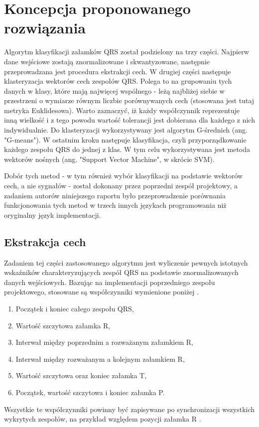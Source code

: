 \section{Koncepcja proponowanego rozwiązania}

\quad Algorytm klasyfikacji załamków QRS został podzielony na trzy części. Najpierw dane wejściowe zostają znormalizowane i skwantyzowane, następnie przeprowadzana jest procedura ekstrakcji cech. W drugiej części następuje klasteryzacja wektorów cech zespołów QRS. Polega to na grupowaniu tych danych w klasy, które mają najwięcej wspólnego - leżą najbliżej siebie w przestrzeni o wymiarze równym liczbie porównywanych cech (stosowana jest tutaj metryka Euklidesowa). Warto zaznaczyć, iż każdy współczynnik reprezentuje inną wielkość i z tego powodu wartość tolerancji jest dobierana dla każdego z nich indywidualnie. Do klasteryzacji wykorzystywany jest algorytm G-średnich (ang. "G-means"). W ostatnim kroku następuje klasyfikacja, czyli przyporządkowanie każdego zespołu QRS do jednej z klas. W tym celu wykorzystywana jest metoda wektorów nośnych (ang. "Support Vector Machine", w skrócie SVM).

Dobór tych metod - w tym również wybór klasyfikacji na podstawie wektorów cech, a nie sygnałów - został dokonany przez poprzedni zespół projektowy, a zadaniem autorów niniejszego raportu było przeprowadzenie porównania funkcjonowania tych metod w trzech innych językach programowania niż oryginalny język implementacji.

\subsection{Ekstrakcja cech}
\qquad Zadaniem tej części zastosowanego algorytmu jest wyliczenie pewnych istotnych wskaźników charakteryzujących zespół QRS na podstawie znormalizowanych danych wejściowych. Bazując na implementacji poprzedniego zespołu projektowego, stosowane są współczynniki wymienione poniżej \cite{RaportKoncowy}.
\begin{enumerate}
	\item Początek i koniec całego zespołu QRS,
	\item Wartość szczytowa załamka R,
	\item Interwał między poprzednim a rozważanym załamkiem R,
	\item Interwał między rozważanym a kolejnym załamkiem R,
	\item Wartość szczytowa oraz koniec załamka T,
	\item Początek, wartość szczytowa i koniec załamka P.
\end{enumerate}
Wszystkie te współczynniki powinny być zapisywane po synchronizacji wszystkich wykrytych zespołów, na przykład względem pozycji załamka R \cite{Augustyniak}.

